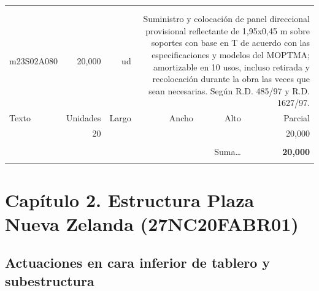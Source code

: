 \documentclass{book}%
\begin{document}
\begin{longtable}{lrrrrr}
\hline%
&&&&&\\%
&&&&&\\%
m23S02A080&    20,000& ud&\multicolumn{3}{p{6cm}}{\scriptsize Suministro y colocación de panel direccional provisional reflectante de 1,95x0,45 m sobre soportes con base en T de acuerdo con las especificaciones y modelos del MOPTMA; amortizable en 10 usos, incluso retirada y recolocación durante la obra las veces que sean necesarias. Según R.D. 485/97 y R.D. 1627/97.\normalsize}\\%
Texto&Unidades&Largo&Ancho&Alto&Parcial\\%
\hline%
\multicolumn{1}{p{3.5cm}}{ }&20&&&&    20,000\\%
&&&&&\\%
\multicolumn{5}{r}{Suma\ldots}&\textbf{    20,000}\\%
\hline%
&&&&&\\%
\end{longtable}%
\newpage

%
\chapter{Capítulo 2. Estructura Plaza Nueva Zelanda (27NC20FABR01)}%
\section{Actuaciones en cara inferior de tablero y subestructura}%
\end{document}
